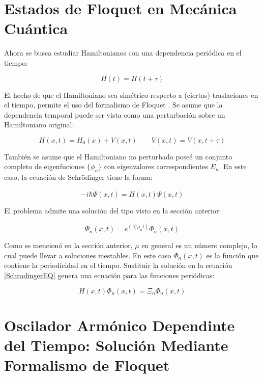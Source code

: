 \documentclass[a4paper,10pt]{report}
\begin{document}
\section{Estados de Floquet en Mecánica Cuántica}

Ahora se busca estudiar Hamiltonianos con una dependencia periódica en el tiempo:

\begin{equation}
H(t)=H(t+\tau)
\end{equation}

El hecho de que el Hamiltoniano sea simétrico respecto a (ciertas) traslaciones en el tiempo, permite el uso del formalismo de Floquet \cite{HanngiDQS}. Se asume que la dependencia temporal puede ser vista como una perturbación sobre un Hamiltoniano original:

\begin{equation}
H(x,t)=H_0(x)+V(x,t) \qquad V(x,t)=V(x,t+\tau)
\end{equation} 

También se asume que el Hamiltoniano no perturbado poseé un conjunto completo de eigenfuciones $\{\phi_n\}$ con eigenvalores correspondientes $E_n$. En este caso, la ecuación de Schr\"{o}dinger tiene la forma:

\begin{equation}\label{SchrodingerEQ}
-i\hbar\dot{\Psi}(x,t) = H(x,t)\Psi(x,t)
\end{equation}

El problema admite una solución del tipo visto en la sección anterior:

\begin{equation}
\Psi_n(x,t) = e^{(\frac{-i}{\hbar}\mu_nt)}\Phi_n(x,t)
\end{equation}

Como se mencionó en la sección anterior, $\mu$ en general es un número complejo, lo cual puede llevar a soluciones inestables. En este caso $\Phi_n(x,t)$ es la función que contiene la periodícidad en el tiempo. Sustituir la solución en la ecuación \ref{SchrodingerEQ} genera una ecuación para las funciones periódicas:

\begin{equation}
H(x,t)\Phi_n(x,t)=\Xi_n\Phi_n(x,t)
\end{equation}

\section{Oscilador Armónico Dependinte del Tiempo: Solución Mediante Formalismo de Floquet}
\end{document}
